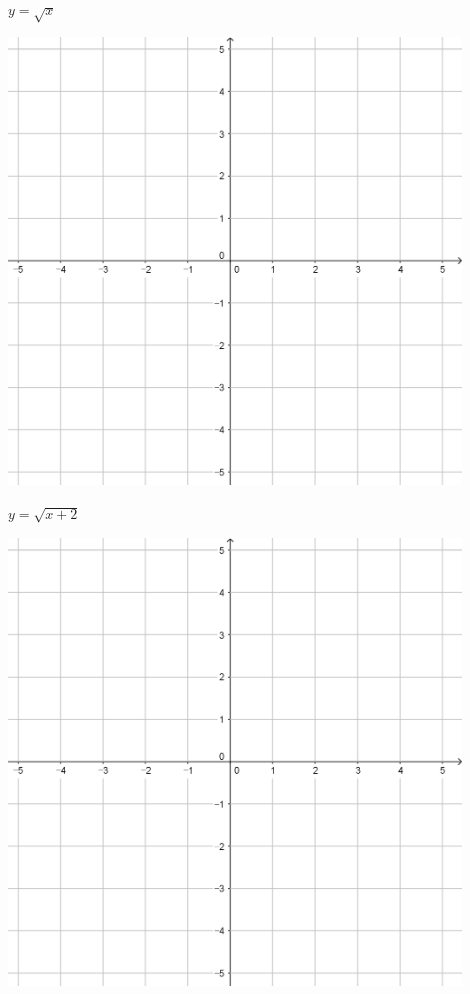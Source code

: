 \documentclass[a4paper]{oblivoir}
\begin{document}
\clearpage
\begin{minipage}{0.45\textwidth}\centering
\(y=\sqrt x\)
\par\bigskip\includegraphics[width=0.9\textwidth]{55}
\end{minipage}
\begin{minipage}{0.45\textwidth}\centering
\(y=\sqrt{x+2}\)
\par\bigskip\includegraphics[width=0.9\textwidth]{55}
\end{minipage}\bigskip\bigskip\par
\end{document}

